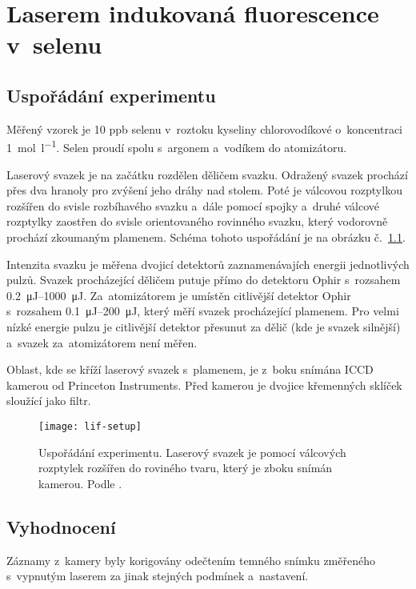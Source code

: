 \chapter[LIF]{Laserem indukovaná fluorescence v~selenu}

\providecommand\xpos{x}
\providecommand\ypos{y}
\providecommand\laser{L}
\providecommand\lif{F}
\providecommand\voigtsigma{\sigma}
\providecommand\voigtgamma{\gamma}

\section{Uspořádání experimentu}
\label{sec:lif-setup}
Měřený vzorek je 10 ppb selenu v roztoku kyseliny chlorovodíkové
o koncentraci \SI{1}{\mol\per\litre}.
Selen proudí spolu s argonem a vodíkem do atomizátoru.

Laserový svazek je na začátku rozdělen děličem svazku.
Odražený svazek prochází přes dva hranoly pro zvýšení jeho dráhy nad stolem.
Poté je válcovou rozptylkou rozšířen do svisle rozbíhavého svazku
a~dále pomocí spojky a~druhé válcové rozptylky zaostřen
do svisle orientovaného rovinného svazku,
který vodorovně prochází zkoumaným plamenem.
Schéma tohoto uspořádání je na obrázku č.~\ref{fig:lif-setup}.

Intenzita svazku je měřena dvojicí detektorů
zaznamenávajích energii jednotlivých pulzů.
Svazek procházející děličem putuje přímo do detektoru
Ophir 
s~rozsahem \SIrange{0.2}{1000}{\micro\joule}.
Za~atomizátorem je umístěn citlivější detektor
Ophir 
s~rozsahem \SIrange{0.1}{200}{\micro\joule},
který měří svazek procházející plamenem.
Pro velmi nízké energie pulzu je citlivější detektor přesunut
za dělič (kde je svazek silnější) a~svazek za~atomizátorem není měřen.

Oblast, kde se kříží laserový svazek s~plamenem, je z~boku snímána
ICCD kamerou  od Princeton Instruments.
Před kamerou je dvojice křemenných sklíček sloužící jako filtr.

\begin{figure}[htb]
	\texttt{[image: lif-setup]}
	\caption{Uspořádání experimentu.
		Laserový svazek je pomocí válcových rozptylek rozšířen
		do roviného tvaru, který je zboku snímán kamerou.
		Podle \cite{lif-oh}.}
	\label{fig:lif-setup}
\end{figure}

\section{Vyhodnocení}
\label{sec:lif-method}
Záznamy z~kamery byly korigovány odečtením temného snímku změřeného
s~vypnutým laserem za jinak stejných podmínek a~nastavení.

